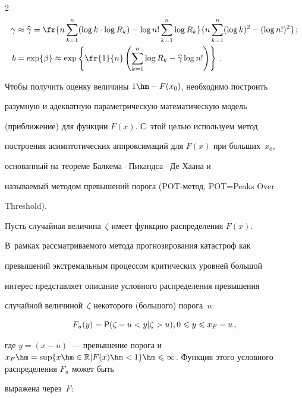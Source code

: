 \begin{multicols}{2}
\begin{align*}


\gamma&\approx\widehat\gamma=\fr{n\sum\limits_{k=1}^n(\log k\cdot\log


R_k)-\log n!\sum\limits_{k=1}^n\log R_k}{n\sum\limits_{k=1}^n(\log k)^2-(\log n!)^2}\,;


\\


b&=\exp\{\beta\}\approx\exp\left\{\fr{1}{n}\left(\sum\limits_{k=1}^n\log


R_k-\widehat\gamma\log n!\right)\right\}\,.


\end{align*}





Чтобы получить оценку величины $1\hm-F(x_0)$, необходимо построить


разумную и адекватную парамет\-рическую математическую модель


(приближение) для функции $F(x)$. С~этой целью используем метод


построения асимптотических аппрокси\-маций для $F(x)$ при больших~$x_0$, 


основанный на теореме Бал\-ке\-ма\,--\,Пи\-канд\-са\,--\,Де Ха\-ана и


называемый методом превышений порога (POT-ме\-тод, POT\;=\;Peaks Over


Threshold).





Пусть случайная величина~$\zeta$ имеет функцию распределения $F(x)$.


В~рамках рассматриваемого метода прогнозирования катастроф как


превышений экстремальным процессом критических \mbox{уровней} большой


интерес представляет описание условного распределения превышения


случайной величиной~$\zeta$ некоторого (большого) порога~$u$:


$$


F_u(y)={\sf P}(\zeta-u < y|\zeta>u), 0\leqslant y \leqslant x_F-u\,,


$$


где $y=(x-u)$~--- превышение порога и $x_F\hm =\sup\{x \hm\in \mathbb{R} | F(x)\hm<1\} 


\hm\leqslant \infty$. Функция этого условного распределения $F_u$ может быть 


выражена через~$F$:






\end{multicols}
